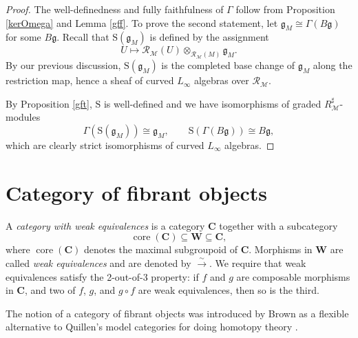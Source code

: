 \documentclass[12pt]{amsart}
\numberwithin{equation}{section}
\theoremstyle{plain}
\newcommand{\bfC}{\mathbf{C}}
\newcommand{\bfW}{\mathbf{W}}
\newcommand{\fg}{\mathfrak{g}}
\newcommand{\sM}{\mathcal{M}}
\newcommand{\sR}{\mathcal{R}}
\newcommand{\sh}{\mathrm{S}}
\begin{document}
	\begin{proof}	
		The well-definedness and fully faithfulness of $\Gamma$ follow from Proposition \ref{kerOmega} and Lemma \ref{gff}. To prove the second statement, let $\fg_M \cong \Gamma(B\fg)$ for some $B\fg$. Recall that $\sh(\fg_M)$ is defined by the assignment
		\[
		U \longmapsto \sR_\sM(U) \otimes_{\sR_\sM(M)} \fg_M.
		\]
		By our previous discussion, $\sh(\fg_M)$ is the completed base change of $\fg_M$ along the restriction map, hence a sheaf of curved $L_\infty$ algebras over $\sR_\sM$.
		
		By Proposition \ref{gft}, $\sh$ is well-defined and we have isomorphisms of graded $R_\sM^\sharp$-modules
		\[
		\Gamma(\sh(\fg_M)) \cong \fg_M, \qquad \sh(\Gamma(B\fg)) \cong B\fg,
		\]
		which are clearly strict isomorphisms of curved $L_\infty$ algebras.
	\end{proof}

	
	\section{Category of fibrant objects}
	
	A \emph{category with weak equivalences} is a category $\bfC$ together with a subcategory
	\[
	\operatorname{core}(\bfC) \subseteq \bfW \subseteq \bfC,
	\]
	where $\operatorname{core}(\bfC)$ denotes the maximal subgroupoid of $\bfC$. Morphisms in $\bfW$ are called \emph{weak equivalences} and are denoted by $\xrightarrow{\sim}$. We require that weak equivalences satisfy the 2-out-of-3 property: if $f$ and $g$ are composable morphisms in $\bfC$, and two of $f$, $g$, and $g \circ f$ are weak equivalences, then so is the third.

	
	The notion of a category of fibrant objects was introduced by Brown as a flexible alternative to Quillen’s model categories for doing homotopy theory \cite{brown1973abstract}.
	
\end{document}

